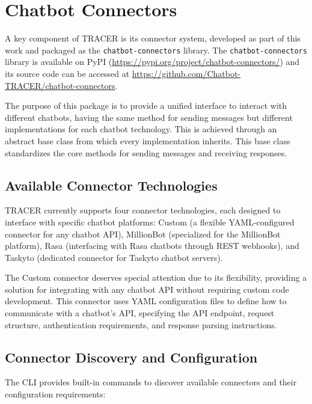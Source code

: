 \section{Chatbot Connectors}\label{sec:chatbot-connectors}

A key component of \ac{TRACER} is its connector system,
developed as part of this work and
packaged as the \texttt{chatbot-connectors} library.
The \texttt{chatbot-connectors} library is available on PyPI
(\url{https://pypi.org/project/chatbot-connectors/})
and its source code can be accessed at
\url{https://github.com/Chatbot-TRACER/chatbot-connectors}.

The purpose of this package is to provide a unified interface
to interact with different chatbots,
having the same method for sending messages
but different implementations for each chatbot technology.
This is achieved through an abstract base class
from which every implementation inherits.
This base class standardizes the core methods
for sending messages and receiving responses.

\subsection{Available Connector Technologies}

\ac{TRACER} currently supports four connector technologies,
each designed to interface with specific chatbot platforms:
Custom (a flexible YAML-configured connector for any chatbot \ac{API}),
MillionBot (specialized for the MillionBot platform),
Rasa (interfacing with Rasa chatbots through \ac{REST} webhooks),
and Taskyto (dedicated connector for Taskyto chatbot servers).

The Custom connector deserves special attention due to its flexibility,
providing a solution for integrating with any chatbot \ac{API}
without requiring custom code development.
This connector uses YAML configuration files
to define how to communicate with a chatbot's \ac{API},
specifying the \ac{API} endpoint, request structure,
authentication requirements, and response parsing instructions.

\subsection{Connector Discovery and Configuration}

The \ac{CLI} provides built-in commands to discover available connectors
and their configuration requirements:

